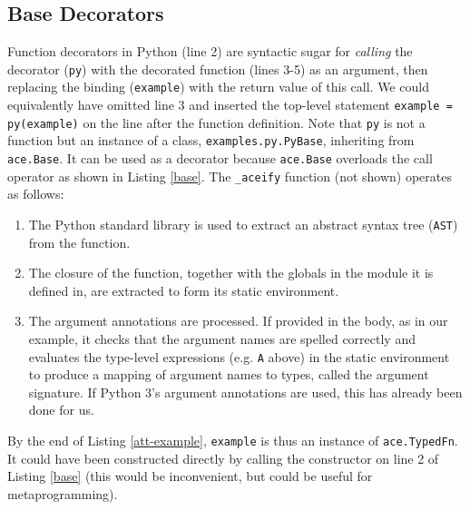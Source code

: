 \documentclass[10pt,preprint]{sigplanconf}
\begin{document}
{\subsection{Base Decorators}
Function decorators in Python (line 2) are syntactic sugar for \emph{calling} the decorator (\verb|py|) with the decorated function (lines 3-5) as an argument, then replacing the binding (\verb|example|)  with the return value of this call. We could equivalently have omitted line 3 and inserted the top-level statement \verb|example = py(example)| on the line after the function definition. Note that \verb|py| is not a function but an instance of a class, \verb|examples.py.PyBase|, inheriting from \verb|ace.Base|. It can be used as a decorator because \verb|ace.Base| overloads the call operator as shown in Listing \ref{base}. The \verb|_aceify| function (not shown) operates as follows:
\begin{enumerate}
\item The Python standard library is used to extract an abstract syntax tree (\verb|AST|) from the function.
\item The closure of the function, together with the globals in the module it is defined in, are extracted to form its static environment.
\item The argument annotations are processed. If provided in the body, as in our example, it checks that the argument names are spelled correctly and evaluates the type-level expressions (e.g. \verb|A| above) in the static environment to produce a mapping of argument names to types, called the argument signature. If Python 3's argument annotations are used, this has  already been done for us.
\end{enumerate}
By the end of Listing \ref{att-example}, \verb|example| is thus an instance of \verb|ace.TypedFn|. It could  have been constructed directly by calling the constructor on line 2 of Listing \ref{base} (this would be inconvenient, but could be useful for metaprogramming). 

}
\end{document}
